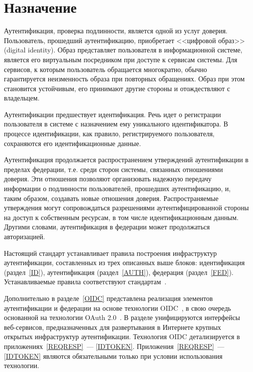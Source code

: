 \section{Назначение}\label{COMMON.Purpose}

Аутентификация, проверка подлинности, является одной из услуг доверия. 
%
Пользователь, прошедший аутентификацию, приобретает <<цифровой образ>> 
(digital identity). Образ представляет пользователя в информационной системе, 
является его виртуальным посредником при доступе к сервисам системы.
%
Для сервисов, к которым пользователь обращается многократно, обычно 
гарантируется неизменность образа при повторных обращениях. 
%
Образ при этом становится устойчивым, его принимают другие стороны 
и отождествляют с владельцем.

Аутентификации предшествует идентификация. Речь идет о регистрации пользователя
в системе с назначением ему уникального идентификатора. В процессе
идентификации, как правило,  регистрируемого
пользователя, сохраняются его идентификационные данные.

Аутентификация продолжается распространением утверждений аутентификации в
пределах федерации, т.е. среди сторон системы, связанных отношениями 
доверия.
%
Эти отношения позволяют организовать надежную передачу информации о подлинности 
пользователей, прошедших аутентификацию, и, таким образом, создавать новые отношения 
доверия.
%
Распространяемые утверждения могут сопровождаться разрешениями
аутентифицированной стороны на доступ к собственным ресурсам, в том числе
идентификационным данным. Другими словами, аутентификация в федерации может
продолжаться авторизацией.


Настоящий стандарт устанавливает правила построения инфраструктур 
аутентификации, составленных из трех описанных выше блоков: 
идентификация (раздел~\ref{ID}), аутентификация (раздел~\ref{AUTH}), 
федерация (раздел~\ref{FED}).
%           
Устанавливаемые правила соответствуют 
стандартам~\cite{SP800-63-3,SP800-63-3A,SP800-63-3B,SP800-63-3C,ISO29115}. 

Дополнительно в разделе~\ref{OIDC} представлена реализация элементов 
аутентификации и федерации на основе технологии OIDC~\cite{OIDC}, в свою 
очередь основанной на технологии OAuth 2.0~\cite{RFC6749}. В разделе 
унифицируются интерфейсы веб-сервисов, предназначенных для развертывания
в Интернете крупных открытых инфраструктур аутентификации.
%
Технология OIDC детализируется в приложениях~\ref{REQRESP}~--- \ref{IDTOKEN}. 
%
Приложения~\ref{REQRESP}~--- \ref{IDTOKEN} являются обязательными только при 
условии использования технологии.

